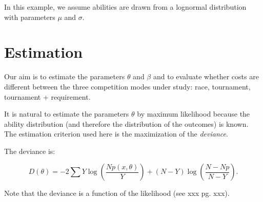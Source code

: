 \documentclass[]{article}
\theoremstyle{plain} %
\begin{document}
In this example, we assume abilities are drawn from a lognormal
distribution with parameters \(\mu\) and \(\sigma\).

\section{Estimation}\label{estimation}

Our aim is to estimate the parameters \(\theta\) and \(\beta\) and to
evaluate whether costs are different between the three competition modes
under study: race, tournament, tournament + requirement.

It is natural to estimate the parameters \(\theta\) by maximum
likelihood because the ability distribution (and therefore the
distribution of the outcomes) is known. The estimation criterion used
here is the maximization of the \emph{deviance}.

The deviance is:

\begin{equation}
    D(\theta) = -2 \sum Y \log (\frac{N p(x, \theta)}{Y}) 
        + (N - Y) \log ( \frac{N - N p}{N - Y}).
\end{equation}

Note that the deviance is a function of the likelihood (see xxx pg.
xxx).
\end{document}
